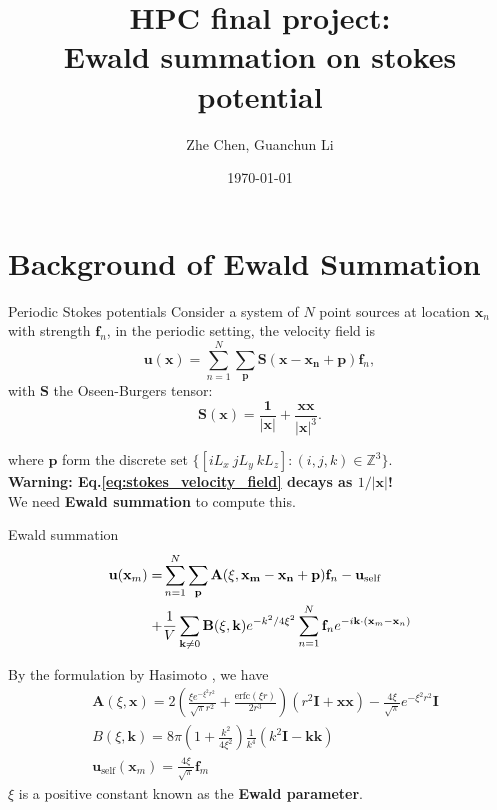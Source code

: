 \documentclass{beamer}
\title[HPC Final Project]{HPC final project: \\
	Ewald summation on stokes potential} %
\author{Zhe Chen, Guanchun Li} %
\institute[CIMS] %
{
Courant Insititute of Mathematical sciences \\ %
\medskip
\textit{gl1705@nyu.edu} %
}
\date{\today} %
\begin{document}
\begin{frame}
\titlepage
\end{frame}

\section{Background of Ewald Summation}
\begin{frame}{Periodic Stokes potentials}
Consider a system of $N$ point sources at location $\mathbf{x}_n$ with strength $\mathbf{f}_n$, in the periodic setting, the velocity field is 
\begin{equation}
\mathbf{u}(\mathbf{x}) = \sum_{n=1}^{N} \sum_{\mathbf{p}} \mathbf{S}(\mathbf{x - x_n + p}) \mathbf{f}_n, \label{eq:stokes_velocity_field}
\end{equation} 
with $\mathbf{S}$ the Oseen-Burgers tensor:
\begin{equation}
\mathbf{S}(\mathbf{x}) = \frac{\mathbf{1}}{|\mathbf{x}|} + \frac{\mathbf{x x}}{|\mathbf{x}|^3}.
\end{equation}
 
where $\mathbf{p}$ form the discrete set $\{[iL_x \ jL_y \  kL_z]:(i, j, k) \in \mathbb{Z}^3\}$.\\

\textbf{Warning: Eq.\eqref{eq:stokes_velocity_field} decays as $1 / |\mathbf{x}|$!} \\

We need \textbf{Ewald summation} to compute this.
\end{frame}

\begin{frame}{Ewald summation}
\begin{eqnarray}
\mathbf{u}(\mathbf{x}_m) = &  \sum_{n=1}^{N} \sum_{\mathbf{p}} \mathbf{A}(\xi, \mathbf{x_m - x_n + p}) \mathbf{f}_n  - \mathbf{u}_{\text{self}} \label{eq:ewald_sum} \notag \\ 
+ &  \frac{1}{V} \sum_{\mathbf{k} \neq 0} \mathbf{B}(\xi, \mathbf{k}) e^{-k^2/4\xi^2}\sum_{n=1}^{N} \mathbf{f}_n e ^{-i \mathbf{k} \cdot (\mathbf{x}_m - \mathbf{x}_n)} 
\end{eqnarray} 

By the formulation by Hasimoto \cite{Hasimoto1959}, we have
\begin{eqnarray}
& \mathbf{A}(\xi, \mathbf{x}) = 2 \left(\frac{\xi e^{-\xi^2 r^2}}{\sqrt{\pi} r^2} + \frac{\text{erfc}(\xi r)}{2 r^3}\right) (r^2 \mathbf{I} + \mathbf{x x}) - \frac{4 \xi}{\sqrt{\pi}} e^{-\xi^2 r^2} \mathbf{I} \\
& B(\xi, \mathbf{k}) = 8 \pi \left(1 + \frac{k^2}{4 \xi^2}\right) \frac{1}{k^4}(k^2 \mathbf{I} - \mathbf{k k})\\
& \mathbf{u}_{\text{self}}(\mathbf{x}_m) = \frac{4 \xi}{\sqrt{\pi}} \mathbf{f}_m
\end{eqnarray}
$\xi$ is a positive constant known as the \textbf{Ewald parameter}.
\end{frame}
\end{document}
